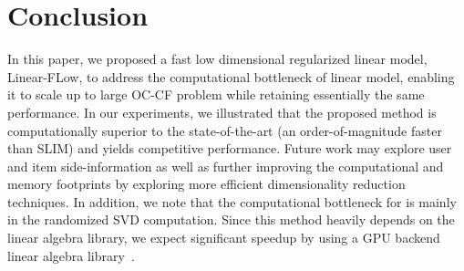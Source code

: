 \documentclass{article}
\newcommand{\citep}{\cite}
\begin{document}
\begin{table*}[!htb]
\end{table*}
% 

\section{Conclusion}

In this paper, we proposed a fast low dimensional regularized linear model, Linear-FLow, to address the computational bottleneck of linear model, enabling it to scale up to large OC-CF problem while retaining essentially the same performance. In our experiments, we illustrated that the proposed method is computationally superior to the state-of-the-art (an order-of-magnitude faster than SLIM) and yields competitive performance. Future work may explore user and item side-information as well as further improving the computational and memory footprints by exploring more efficient dimensionality reduction techniques. In addition, we note that the computational bottleneck for \LinearLow is mainly in the randomized SVD computation. Since this method heavily depends on the linear algebra library, we expect significant speedup by using a GPU backend linear algebra library~\citep{Voronin:GPURSVD}.

\newpage



\end{document}
